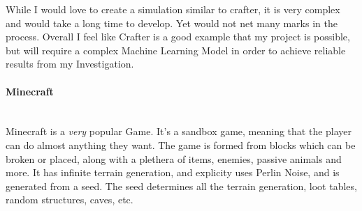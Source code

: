 \begin{flushleft}
                            \vspace{0.2cm}
                            \begin{figure}
                                \centering
                                \qquad
                            \end{figure}
                            \vspace{0.2cm}

                            While I would love to create a simulation similar to crafter, it is very complex and would take a long time to develop. Yet
                            would not net many marks in the process. Overall I feel like Crafter is a good example that my project is possible, but will
                            require a complex Machine Learning Model in order to achieve reliable results from my Investigation.

                        \vspace{1cm}
                    \paragraph{Minecraft} \mbox{} \\
                        \vspace{0.2cm}
                        Minecraft is a \textit{very} popular Game. It's a sandbox game, meaning that the player can do almost anything they want.
                        The game is formed from blocks which can be broken or placed, along with a plethera of items, enemies, passive animals
                        and more. It has infinite terrain generation, and explicity uses Perlin Noise, and is generated from a seed. The seed determines
                        all the terrain generation, loot tables, random structures, caves, etc. \\
                        

\end{flushleft}
